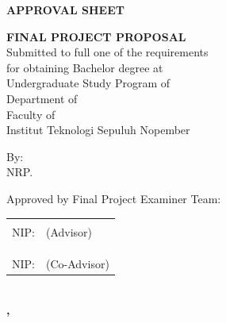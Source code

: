 \setcounter{page}{2}

\setlength{\parskip}{8pt}

\fancyfoot[L]{}
\fancyfoot[C]{}
\fancyfoot[R]{\hspace{-1cm}\thepage}

\vspace{6pt}
\begin{center}
  \fontsize{14}{16.8}\selectfont
  \textbf{APPROVAL SHEET}
\end{center}
\vspace{18pt}

\begin{center}
  \textbf{\engtatitle{}}
\end{center}

\begingroup
\small

\begin{center}
  \textbf{FINAL PROJECT PROPOSAL}
  \\Submitted to full one of the requirements \\
  for obtaining Bachelor degree at \\
  Undergraduate Study Program of \engstudyprogram{} \\
  Department of \engdepartment{} \\
  Faculty of \engfaculty{} \\
  Institut Teknologi Sepuluh Nopember
\end{center}

\begin{center}
  By: \textbf{\name{}}
  \\NRP. \nrp{}
\end{center}

\begin{center}
  Approved by Final Project Examiner Team:
\end{center}

\begingroup
\setlength{\tabcolsep}{0pt}

\noindent
\begin{tabularx}{\textwidth}{X l}
  \advisor{} & \\ NIP: \advisornip{} & (Advisor) \\ & \\ & \\
  \coadvisor{} & \\ NIP: \coadvisornip{} & (Co-Advisor) \\
\end{tabularx}
\endgroup

\begin{center}
  \textbf{\MakeUppercase{\place{}}\\\ENGMONTH{}, \the\year{}}
\end{center}
\endgroup

